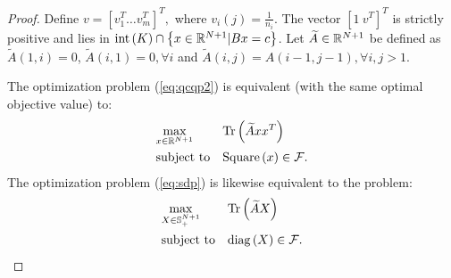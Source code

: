 \begin{proof}
 Define $v = \left[v_1^T \ldots v_m^T\right]^T,$ where $v_i\left(j\right) = \frac{1}{n_i}$. %
%
 The vector $\left[1~ v^{T}\right]^T$ is strictly positive and lies in $\mathrm{int}\left(K\right) \cap \left\{x \in \mathbb{R}^{N+1} | B x = c \right\}$.
%
 Let $\widetilde{A} \in \mathbb{R}^{N+1}$ be defined as $\widetilde{A}\left(1,i\right) = 0$, $\widetilde{A}\left(i,1\right) = 0, \forall i$ and $\widetilde{A}\left(i,j\right) = A\left(i-1,j-1\right), \forall i,j > 1$.

 The optimization problem (\ref{eq:qcqp2}) is equivalent (with
 the same optimal objective value) to:
\begin{equation*}%
\begin{aligned}
& \underset{x \in \RR^{N+1}}{\text{max}}
& &\mathrm{Tr}\left(\widetilde{A} x x^T\right) \\
& \text{subject to}
& &\mathrm{Square}\left(x\right) \in \mathcal{F}.\\
\end{aligned}
\end{equation*}
The optimization problem (\ref{eq:sdp}) is likewise equivalent to the problem:
\begin{equation*}
\begin{aligned}
& \underset{X \in \mathbb{S}_{+}^{N+1}}{\text{max}}
& &\mathrm{Tr}\left(\widetilde{A} X\right) \\
& \text{subject to}
& &\mathrm{diag}\left(X\right) \in \mathcal{F}.\\
\end{aligned}
\end{equation*}





\end{proof}
